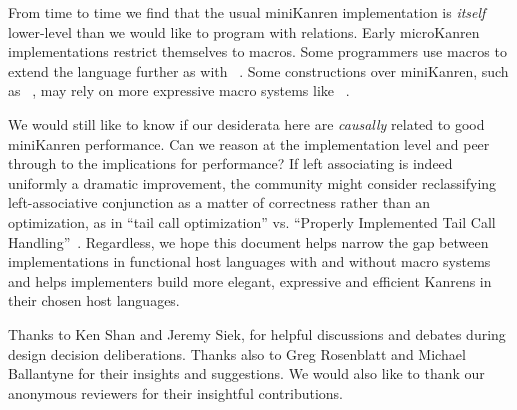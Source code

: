 \documentclass[sigplan,draft,balance,pbalance,natbib=false]{acmart}
\begin{document}
From time to time we find that the usual miniKanren implementation is
\emph{itself} lower-level than we would like to program with
relations. Early microKanren implementations restrict themselves to
 macros. Some programmers use macros to
extend the language further as with
~\cite{keep2009pattern}. Some constructions over
miniKanren, such as
~\cite{ballantyne2020macros}, may rely on
more expressive macro systems like
~\cite{culpepper2012fortifying}.

We would still like to know if our desiderata here are \emph{causally}
related to good miniKanren performance. Can we reason at the
implementation level and peer through to the implications for
performance? If left associating  is indeed uniformly
a dramatic improvement, the community might consider reclassifying
left-associative conjunction as a matter of correctness rather than an
optimization, as in \enquote{tail call optimization} vs.
\enquote{Properly Implemented Tail Call
  Handling}~\cite{felleisen2014requestions}. Regardless, we hope this
document helps narrow the gap between implementations in functional
host languages with and without macro systems and helps implementers
build more elegant, expressive and efficient Kanrens in their chosen
host languages.

\begin{acks}

  Thanks to Ken Shan and Jeremy Siek, for helpful discussions and
  debates during design decision deliberations. Thanks also to Greg
  Rosenblatt and Michael Ballantyne for their insights and
  suggestions. We would also like to thank our anonymous reviewers
  for their insightful contributions.

\end{acks}

\printbibliography{}
\end{document}
